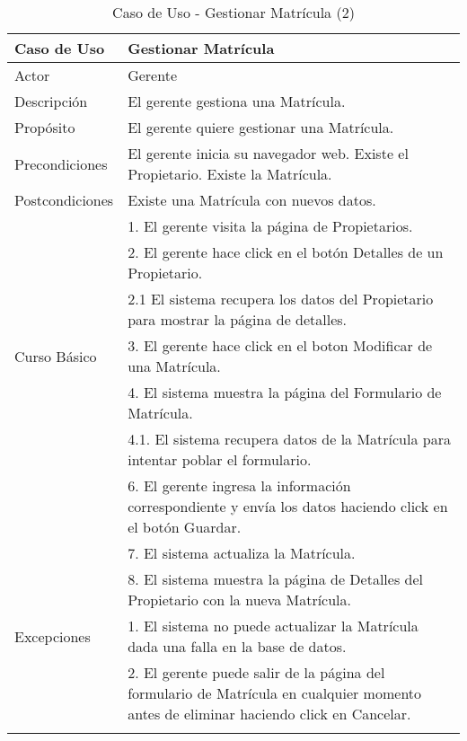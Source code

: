 \begin{longtable}{@{} p{3cm} p{10cm} @{}} \toprule
    \textbf{Caso de Uso}    & Gestionar Matrícula \\ \midrule
    Actor                   & Gerente \\ \cmidrule{1-2}
    Descripción             & El gerente gestiona una Matrícula. \\ \cmidrule{1-2}
    Propósito               & El gerente quiere gestionar una Matrícula. \\ \cmidrule{1-2}
    Precondiciones          & El gerente inicia su navegador web. Existe el Propietario. Existe la Matrícula. \\ \cmidrule{1-2} 
    Postcondiciones         & Existe una Matrícula con nuevos datos. \\ \cmidrule{1-2} 
                            & 1. El gerente visita la página de Propietarios. \\ 
                            & 2. El gerente hace click en el botón Detalles de un Propietario. \\
                            & 2.1 El sistema recupera los datos del Propietario para mostrar la página de detalles. \\
    Curso Básico            & 3. El gerente hace click en el boton Modificar de una Matrícula. \\
                            & 4. El sistema muestra la página del Formulario de Matrícula. \\
                            & 4.1. El sistema recupera datos de la Matrícula para intentar poblar el formulario. \\
                            & 6. El gerente ingresa la información correspondiente y envía los datos haciendo click en el botón Guardar. \\ 
                            & 7. El sistema actualiza la Matrícula. \\ 
                            & 8. El sistema muestra la página de Detalles del Propietario con la nueva Matrícula. \\ \cmidrule{1-2}
    Excepciones             & 1. El sistema no puede actualizar la Matrícula dada una falla en la base de datos. \\
                            & 2. El gerente puede salir de la página del formulario de Matrícula en cualquier momento antes de eliminar haciendo click en Cancelar. \\ \bottomrule
   \caption{Caso de Uso - Gestionar Matrícula (2)} \label{tab:tabcu-matri2} \\
   \end{longtable}

